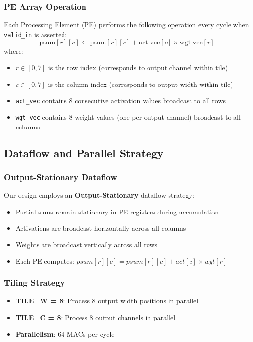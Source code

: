 \documentclass[11pt,a4paper]{article}
\begin{document}
\subsubsection{PE Array Operation}
Each Processing Element (PE) performs the following operation every cycle when \texttt{valid\_in} is asserted:
\[
\text{psum}[r][c] \leftarrow \text{psum}[r][c] + \text{act\_vec}[c] \times \text{wgt\_vec}[r]
\]
where:
\begin{itemize}
    \item $r \in [0,7]$ is the row index (corresponds to output channel within tile)
    \item $c \in [0,7]$ is the column index (corresponds to output width within tile)
    \item \texttt{act\_vec} contains 8 consecutive activation values broadcast to all rows
    \item \texttt{wgt\_vec} contains 8 weight values (one per output channel) broadcast to all columns
\end{itemize}

\subsection{Dataflow and Parallel Strategy}

\subsubsection{Output-Stationary Dataflow}
Our design employs an \textbf{Output-Stationary} dataflow strategy:
\begin{itemize}
    \item Partial sums remain stationary in PE registers during accumulation
    \item Activations are broadcast horizontally across all columns
    \item Weights are broadcast vertically across all rows
    \item Each PE computes: $psum[r][c] = psum[r][c] + act[c] \times wgt[r]$
\end{itemize}

\subsubsection{Tiling Strategy}
\begin{itemize}
    \item \textbf{TILE\_W = 8}: Process 8 output width positions in parallel
    \item \textbf{TILE\_C = 8}: Process 8 output channels in parallel
    \item \textbf{Parallelism}: 64 MACs per cycle
\end{itemize}
\end{document}
